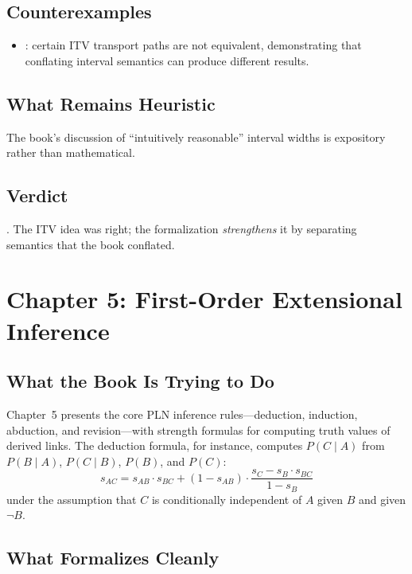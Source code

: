 \documentclass[11pt,openany]{report}
\begin{document}
\section{Counterexamples}

\begin{itemize}
\item {}: certain ITV
  transport paths are not equivalent, demonstrating that conflating
  interval semantics can produce different results.
\end{itemize}

\section{What Remains Heuristic}

The book's discussion of ``intuitively reasonable'' interval widths
is expository rather than mathematical.

\section{Verdict}

\verdictCorrected{}.  The ITV idea was right; the formalization
\emph{strengthens} it by separating semantics that the book conflated.


\chapter{Chapter 5: First-Order Extensional Inference}
\label{ch:review-ch5}

\section{What the Book Is Trying to Do}

Chapter~5 presents the core PLN inference rules---deduction, induction,
abduction, and revision---with strength formulas for computing truth values
of derived links.  The deduction formula, for instance, computes
$P(C \mid A)$ from $P(B \mid A)$, $P(C \mid B)$, $P(B)$, and $P(C)$:
\[
  s_{AC} = s_{AB} \cdot s_{BC} + (1 - s_{AB}) \cdot
  \frac{s_C - s_B \cdot s_{BC}}{1 - s_B}
\]
under the assumption that $C$ is conditionally independent of $A$
given $B$ and given $\lnot B$.

\section{What Formalizes Cleanly}
\end{document}
